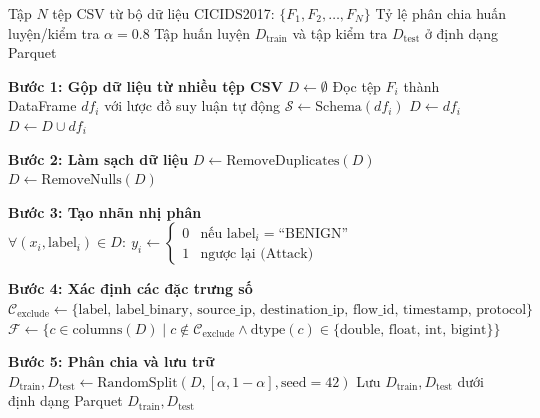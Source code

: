 
\begin{algorithm}[htbp]
\caption{Thuật toán Tiền xử lý Dữ liệu CICIDS2017}
\label{data_preparation_ag}
\begin{algorithmic}[1]
\Require Tập $N$ tệp CSV từ bộ dữ liệu CICIDS2017: $\{F_1, F_2, \dots, F_N\}$
\Statex \qquad Tỷ lệ phân chia huấn luyện/kiểm tra $\alpha = 0.8$
\Ensure Tập huấn luyện $D_{\text{train}}$ và tập kiểm tra $D_{\text{test}}$ ở định dạng Parquet

\State \textbf{Bước 1: Gộp dữ liệu từ nhiều tệp CSV}
\State $D \gets \emptyset$
    \State Đọc tệp $F_i$ thành DataFrame $df_i$ với lược đồ suy luận tự động
    \State {} 
    \State {} 
        \State $\mathcal{S} \gets \text{Schema}(df_i)$ 
        \State $D \gets df_i$
    \Else
        \State {} 
        \State $D \gets D \cup df_i$ 
    \EndIf
\EndFor

\State \textbf{Bước 2: Làm sạch dữ liệu}
\State $D \gets \text{RemoveDuplicates}(D)$ 
\State $D \gets \text{RemoveNulls}(D)$ 

\State \textbf{Bước 3: Tạo nhãn nhị phân}
\State $\forall (x_i, \text{label}_i) \in D: \ y_i \gets \begin{cases} 0 & \text{nếu label}_i = \text{``BENIGN''} \\ 1 & \text{ngược lại (Attack)} \end{cases}$

\State \textbf{Bước 4: Xác định các đặc trưng số}
\State $\mathcal{C}_{\text{exclude}} \gets \{\text{label, label\_binary, source\_ip, destination\_ip, flow\_id, timestamp, protocol}\}$
\State $\mathcal{F} \gets \{c \in \text{columns}(D) \mid c \notin \mathcal{C}_{\text{exclude}} \wedge \text{dtype}(c) \in \{\text{double, float, int, bigint}\}\}$

\State \textbf{Bước 5: Phân chia và lưu trữ}
\State $D_{\text{train}}, D_{\text{test}} \gets \text{RandomSplit}(D, [\alpha, 1 - \alpha], \text{seed} = 42)$
\State Lưu $D_{\text{train}}, D_{\text{test}}$ dưới định dạng Parquet
\State \Return $D_{\text{train}}, D_{\text{test}}$
\end{algorithmic}
\end{algorithm}
